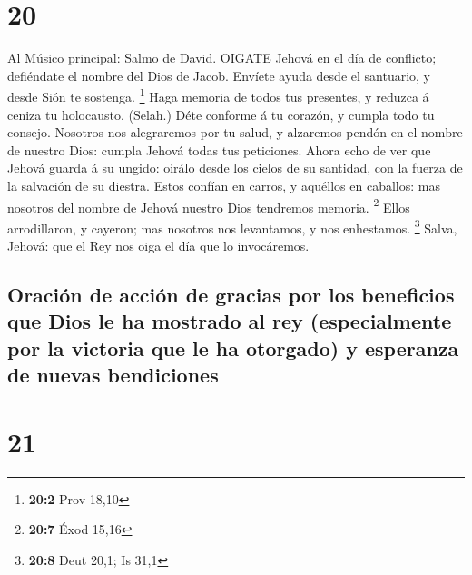 \hypertarget{section-19}{%
\section{20}\label{section-19}}

 Al Músico principal: Salmo de David. OIGATE Jehová en el
día de conflicto; defiéndate el nombre del Dios de Jacob. 
Envíete ayuda desde el santuario, y desde Sión te sostenga. \footnote{\textbf{20:2}
  Prov 18,10}  Haga memoria de todos tus presentes, y
reduzca á ceniza tu holocausto. (Selah.)  Déte conforme á tu
corazón, y cumpla todo tu consejo.  Nosotros nos alegraremos
por tu salud, y alzaremos pendón en el nombre de nuestro Dios: cumpla
Jehová todas tus peticiones.  Ahora echo de ver que Jehová
guarda á su ungido: oirálo desde los cielos de su santidad, con la
fuerza de la salvación de su diestra.  Estos confían en
carros, y aquéllos en caballos: mas nosotros del nombre de Jehová
nuestro Dios tendremos memoria. \footnote{\textbf{20:7} Éxod 15,16}
 Ellos arrodillaron, y cayeron; mas nosotros nos levantamos,
y nos enhestamos. \footnote{\textbf{20:8} Deut 20,1; Is 31,1}
 Salva, Jehová: que el Rey nos oiga el día que lo
invocáremos.

\hypertarget{oraciuxf3n-de-acciuxf3n-de-gracias-por-los-beneficios-que-dios-le-ha-mostrado-al-rey-especialmente-por-la-victoria-que-le-ha-otorgado-y-esperanza-de-nuevas-bendiciones}{%
\subsection{Oración de acción de gracias por los beneficios que Dios le
ha mostrado al rey (especialmente por la victoria que le ha otorgado) y
esperanza de nuevas
bendiciones}\label{oraciuxf3n-de-acciuxf3n-de-gracias-por-los-beneficios-que-dios-le-ha-mostrado-al-rey-especialmente-por-la-victoria-que-le-ha-otorgado-y-esperanza-de-nuevas-bendiciones}}

\hypertarget{section-20}{%
\section{21}\label{section-20}}

